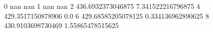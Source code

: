 0 nan nan
1 nan nan
2 436.6932373046875 7.341522216796875
4 429.3517150878906 0.0
6 429.68585205078125 0.334136962890625
8 430.9103698730469 1.55865478515625
